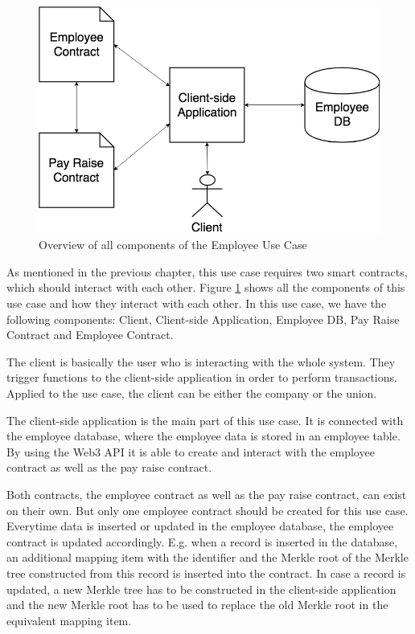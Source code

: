 \begin{figure}[h]%
	\centering
	\includegraphics[width=1.0\textwidth]{images/payraiseusecase.png}
	\caption{\label{fig:payraiseusecase}Overview of all components of the Employee Use Case}
\end{figure}

As mentioned in the previous chapter, this use case requires two smart contracts, which should interact with each other. Figure \ref{fig:payraiseusecase} shows all the components of this use case and how they interact with each other. In this use case, we have the following components: Client, Client-side Application, Employee DB, Pay Raise Contract and Employee Contract.

The client is basically the user who is interacting with the whole system. They trigger functions to the client-side application in order to perform transactions. Applied to the use case, the client can be either the company or the union.

The client-side application is the main part of this use case. It is connected with the employee database, where the employee data is stored in an employee table. By using the Web3 API it is able to create and interact with the employee contract as well as the pay raise contract.

Both contracts, the employee contract as well as the pay raise contract, can exist on their own. But only one employee contract should be created for this use case. Everytime data is inserted or updated in the employee database, the employee contract is updated accordingly. E.g. when a record is inserted in the database, an additional mapping item with the identifier and the Merkle root of the Merkle tree constructed from this record is inserted into the contract. In case a record is updated, a new Merkle tree has to be constructed in the client-side application and the new Merkle root has to be used to replace the old Merkle root in the equivalent mapping item.

